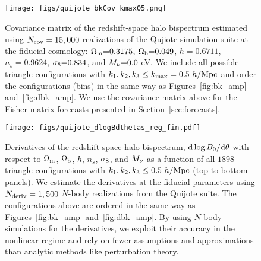 \begin{figure}
\begin{center}
    \texttt{[image: figs/quijote\_bkCov\_kmax05.png]} 
    \caption{Covariance matrix of the redshift-space halo bispectrum estimated 
    using $N_{\rm cov} = 15,000$ realizations of the Qujiote simulation suite at 
    the fiducial cosmology: $\Omega_{\rm m}{=}0.3175$, $\Omega_{\rm b}{=}0.049$, $h{=}0.6711$, $n_s{=}0.9624$, $\sigma_8{=}0.834$, 
    and $M_\nu{=}0.0$ eV. We include all possible triangle configurations with 
    $k_1, k_2, k_3 \leq k_{\rm max} = 0.5~h/{\rm Mpc}$ and order the configurations 
    (bins) in the same way as Figures~\ref{fig:bk_amp} and~\ref{fig:dbk_amp}. We 
    use the covariance matrix above for the Fisher matrix forecasts presented in 
    Section~\ref{sec:forecasts}. 
    }
\label{fig:bk_cov}
\end{center}
\end{figure}

\begin{figure}
\begin{center}
    \texttt{[image: figs/quijote\_dlogBdthetas\_reg\_fin.pdf]} 
    \caption{Derivatives of the redshift-space halo bispectrum, ${\rm d}\log B_0 / {\rm d} \theta$ 
    with respect to $\Omega_{\rm m}$, $\Omega_{\rm b}$, $h$, $n_s$, $\sigma_8$, and $M_\nu$ as a function 
    of all $1898$ triangle configurations with $k_1, k_2, k_3 \leq 0.5~h/{\rm Mpc}$ 
    (top to bottom panels). We estimate the derivatives at the fiducial parameters 
    using $N_{\rm deriv} = 1,500$ $N$-body realizations from the Quijote suite. 
    The configurations above are ordered in the same way as Figures~\ref{fig:bk_amp} 
    and~\ref{fig:dbk_amp}. By using $N$-body simulations for the derivatives, we 
    exploit their accuracy in the nonlinear regime and rely on fewer assumptions 
    and approximations than analytic methods like perturbation theory. 
    }
\label{fig:bk_deriv}
\end{center}
\end{figure}


